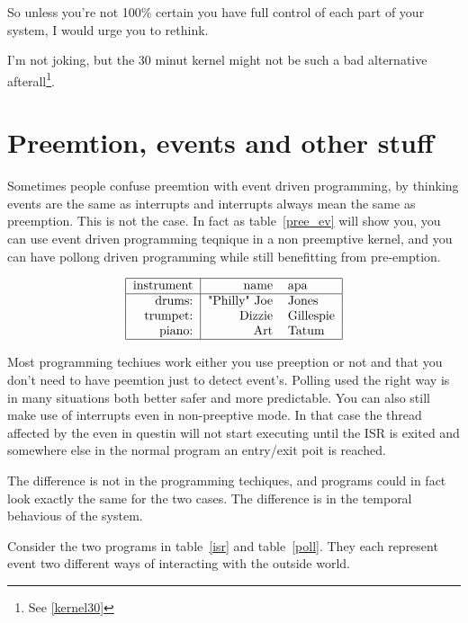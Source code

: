 So unless you're not 100\% certain you have full control of each part of your system, I would urge you to rethink.

I'm not joking, but the 30 minut kernel might not be such a bad alternative afterall\footnote{See \ref{kernel30}}.

\section{Preemtion, events and other stuff}
 Sometimes people confuse preemtion with event driven programming, by thinking events are the same as interrupts and interrupts always mean the same as preemption. This is not the case. In fact as table~\ref{pree_ev} will show you, you can use event driven programming teqnique in a non preemptive kernel, and you can have pollong driven programming while still benefitting from pre-emption. 


\begin{table}[!hbp]
$$%
\begin{tabular}{|r|rl|}
\hline
instrument & name &apa \\ \hline
drums: &"Philly" Joe & Jones\\
trumpet:& Dizzie & Gillespie\\
piano: &Art&Tatum\\ \hline
\end{tabular}
$$%
\caption{Bleh.\label{pree_ev}}
\end{table}



Most programming techiues work either you use preeption or not and that you don't need to have peemtion just to detect event's. Polling used the right way is in many situations both better safer and more predictable. You can also still make use of interrupts even in non-preeptive mode. In that case the thread affected by the even in questin will not start executing until the ISR is exited and somewhere else in the normal program an entry/exit poit is reached.

The difference is not in the programming techiques, and programs could in fact look exactly the same for the two cases. The difference is in the temporal behavious of the system. 

Consider the two programs in table~\ref{isr} and table~\ref{poll}. They each represent event  two different ways of interacting with the outside world.

